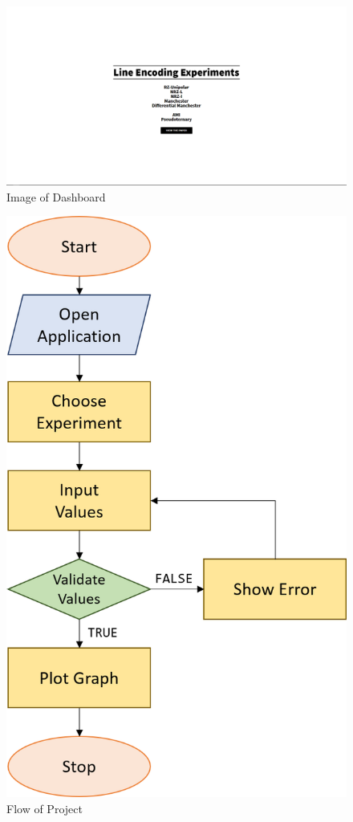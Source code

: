 \documentclass[10pt,journal,compsoc]{IEEEtran}
\begin{document}
\begin{figure}[h]
\centering
\includegraphics[scale=0.15]{one.png}
\caption{Image of Dashboard}
\end{figure}

\begin{figure}[H]
\centering
\includegraphics[scale=0.5]{flowchart.png}
\caption{Flow of Project}
\end{figure}
\end{document}
